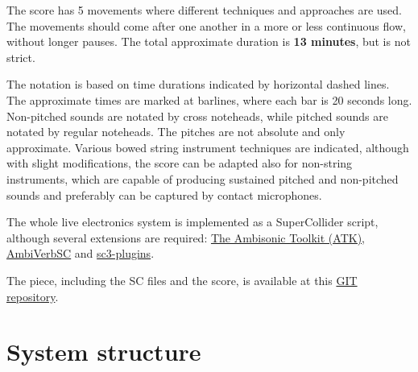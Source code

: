 \documentclass{article}
\begin{document}
The score has 5 movements where different techniques and approaches are used.
The movements should come after one another in a more or less continuous flow, without longer pauses.
The total approximate duration is \textbf{13 minutes}, but is not strict.

The notation is based on time durations indicated by horizontal dashed lines. The approximate times are marked at barlines, where each bar is 20 seconds long.
Non-pitched sounds are notated by cross noteheads, while pitched sounds are notated by regular noteheads.
The pitches are not absolute and only approximate. Various bowed string instrument techniques are indicated,
although with slight modifications, the score can be adapted also for non-string instruments,
which are capable of producing sustained pitched and non-pitched sounds and preferably can be captured by contact microphones.

The whole live electronics system is implemented as a SuperCollider script, although several extensions are required: \href{https://github.com/ambisonictoolkit/atk-sc3}{The Ambisonic Toolkit (ATK)}, \href{https://github.com/JamesWenlock/AmbiVerbSC}{AmbiVerbSC} and \href{https://github.com/supercollider/sc3-plugins}{sc3-plugins}.

The piece, including the SC files and the score, is available at this \href{https://github.com/filip-dobrocky/unveil-live-electronics}{GIT repository}.

\newpage
\section*{System structure} \label{system_structure}
\end{document}
